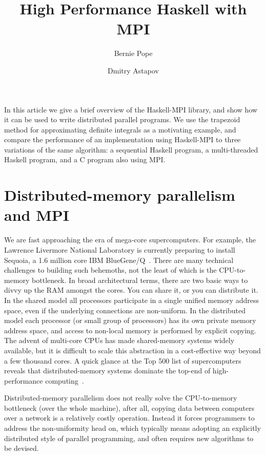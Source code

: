 \documentclass{tmr}
\title{High Performance Haskell with MPI}
\author{Bernie Pope\email{bjpope@unimelb.edu.au}}
\author{Dmitry Astapov\email{dastapov@gmail.com}}
\begin{document}
\begin{introduction}
In this article we give a brief overview of the Haskell-MPI library, and show how it can be used to write distributed
parallel programs. We use the trapezoid method for approximating definite integrals as a motivating example,
and compare the performance of an implementation using Haskell-MPI to three variations of the same algorithm: a sequential
Haskell program, a multi-threaded Haskell program, and a C program also using MPI.
\end{introduction}

\section{Distributed-memory parallelism and MPI}

We are fast approaching the era of mega-core
supercomputers. For example, the Lawrence Livermore National Laboratory
is currently preparing to install Sequoia, a 1.6 million core IBM
BlueGene/Q~\cite{Sequoia}. There are many technical
challenges to building such behemoths, not the least of which is
the CPU-to-memory bottleneck. In broad architectural terms, there are two basic ways to
divvy up the RAM amongst the cores. You can share it, or you can distribute it.
In the shared model all processors participate in a single unified memory address space, even if
the underlying connections are non-uniform. In the distributed model each processor (or small group
of processors) has its own private memory address space, and access to non-local memory is
performed by explicit copying. The advent of multi-core CPUs has made shared-memory systems
widely available, but it is difficult to scale this abstraction in a
cost-effective way beyond a few thousand cores. A quick glance at the Top 500 list of supercomputers reveals
that distributed-memory systems dominate the top-end of high-performance computing~\cite{top-500}.

Distributed-memory parallelism does not really solve the CPU-to-memory bottleneck (over the whole machine),
after all, copying data between computers over a network is a relatively costly operation.
Instead it forces programmers to
address the non-uniformity head on, which typically means adopting an explicitly distributed style of
parallel programming, and often requires new algorithms to be devised.
\end{document}
